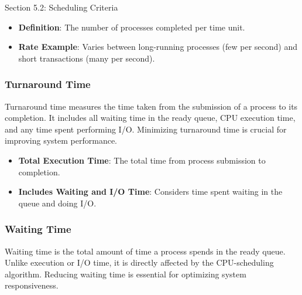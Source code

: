 \begin{notes}{Section 5.2: Scheduling Criteria}
    \begin{highlight}[Throughput]
    
        \begin{itemize}
            \item \textbf{Definition}: The number of processes completed per time unit.
            \item \textbf{Rate Example}: Varies between long-running processes (few per second) and short transactions (many per second).
        \end{itemize}
    
    \end{highlight}
    
    \subsubsection*{Turnaround Time}
    
    Turnaround time measures the time taken from the submission of a process to its completion. It includes all waiting time in the ready queue, CPU execution time, and any time spent performing I/O. Minimizing 
    turnaround time is crucial for improving system performance.
    
    \begin{highlight}
    
        \begin{itemize}
            \item \textbf{Total Execution Time}: The total time from process submission to completion.
            \item \textbf{Includes Waiting and I/O Time}: Considers time spent waiting in the queue and doing I/O.
        \end{itemize}
    
    \end{highlight}
    
    \subsubsection*{Waiting Time}
    
    Waiting time is the total amount of time a process spends in the ready queue. Unlike execution or I/O time, it is directly affected by the CPU-scheduling algorithm. Reducing waiting time is essential for 
    optimizing system responsiveness.
    
    \begin{highlight}
    

\end{highlight}
\end{notes}
